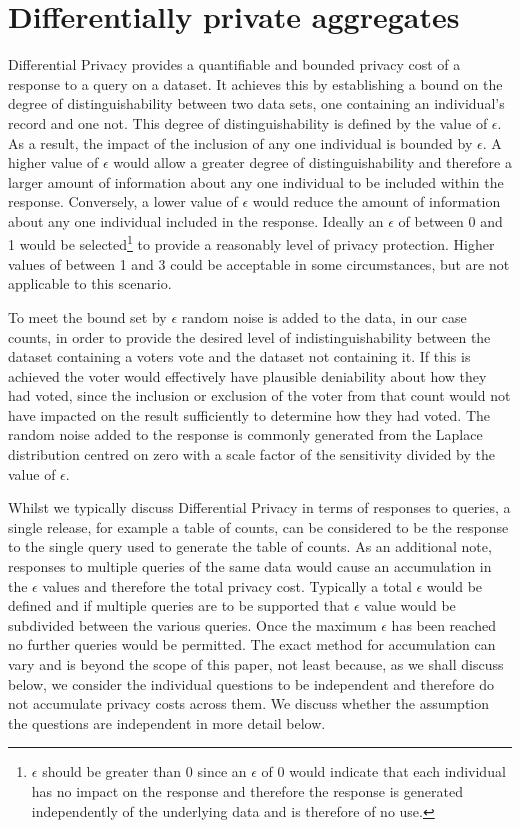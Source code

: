 \documentclass[10pt,a4paper]{article}
\begin{document}
\section{Differentially private aggregates}
Differential Privacy provides a quantifiable and bounded privacy cost of a response to a query on a dataset. It achieves this by establishing a bound on the degree of distinguishability between two data sets, one containing an individual's record and one not. This degree of distinguishability is defined by the value of $\epsilon$. As a result, the impact of the inclusion of any one individual is bounded by $\epsilon$. A higher value of $\epsilon$ would allow a greater degree of distinguishability and therefore a larger amount of information about any one individual to be included within the response. Conversely, a lower value of $\epsilon$ would reduce the amount of information about any one individual included in the response. Ideally an $\epsilon$ of between 0 and 1 would be selected\footnote{$\epsilon$ should be greater than 0 since an $\epsilon$ of 0 would indicate that each individual has no impact on the response and therefore the response is generated independently of the underlying data and is therefore of no use.} to provide a reasonably level of privacy protection. Higher values of between 1 and 3 could be acceptable in some circumstances, but are not applicable to this scenario. 

To meet the bound set by $\epsilon$ random noise is added to the data, in our case counts, in order to provide the desired level of indistinguishability between the dataset containing a voters vote and the dataset not containing it. If this is achieved the voter would effectively have plausible deniability about how they had voted, since the inclusion or exclusion of the voter from that count would not have impacted on the result sufficiently to determine how they had voted. The random noise added to the response is commonly generated from the Laplace distribution centred on zero with a scale factor of the sensitivity divided by the value of $\epsilon$.

Whilst we typically discuss Differential Privacy in terms of responses to queries, a single release, for example a table of counts, can be considered to be the response to the single query used to generate the table of counts. As an additional note, responses to multiple queries of the same data would cause an accumulation in the $\epsilon$ values and therefore the total privacy cost. Typically a total $\epsilon$ would be defined and if multiple queries are to be supported that $\epsilon$ value would be subdivided between the various queries. Once the maximum $\epsilon$ has been reached no further queries would be permitted. The exact method for accumulation can vary and is beyond the scope of this paper, not least because, as we shall discuss below, we consider the individual questions to be independent and therefore do not accumulate privacy costs across them. We discuss whether the assumption the questions are independent in more detail below. 
\end{document}
